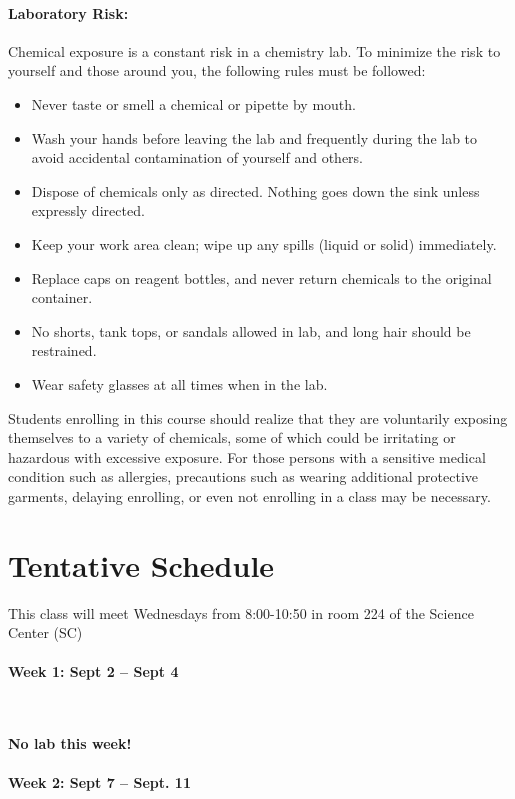 \documentclass[12pt, letterpaper]{article}
\begin{document}
\paragraph{Laboratory Risk:}
Chemical exposure is a constant risk in a chemistry lab. To minimize the risk to yourself and those around you, the following rules must be followed:
\begin{itemize}
	\item Never taste or smell a chemical or pipette by mouth.
	\item Wash your hands before leaving the lab and frequently during the lab to avoid accidental contamination of yourself and others.
	\item Dispose of chemicals only as directed. Nothing goes down the sink unless expressly directed.
	\item Keep your work area clean; wipe up any spills (liquid or solid) immediately.
	\item Replace caps on reagent bottles, and never return chemicals to the original container.
	\item No shorts, tank tops, or sandals allowed in lab, and long hair should be restrained.
	\item Wear safety glasses at all times when in the lab.
\end{itemize}
Students enrolling in this course should realize that they are voluntarily exposing themselves to a variety of chemicals, some of which could be irritating or hazardous with excessive exposure.  For those persons with a sensitive medical condition such as allergies, precautions such as wearing additional protective garments, delaying enrolling, or even not enrolling in a class may be necessary.

\section*{Tentative Schedule}
This class will meet Wednesdays from 8:00-10:50 in room 224 of the Science Center (SC)

\paragraph{Week 1: Sept 2 -- Sept 4}~

\textbf{No lab this week!}

\paragraph{Week 2: Sept 7 -- Sept. 11}~
\end{document}
